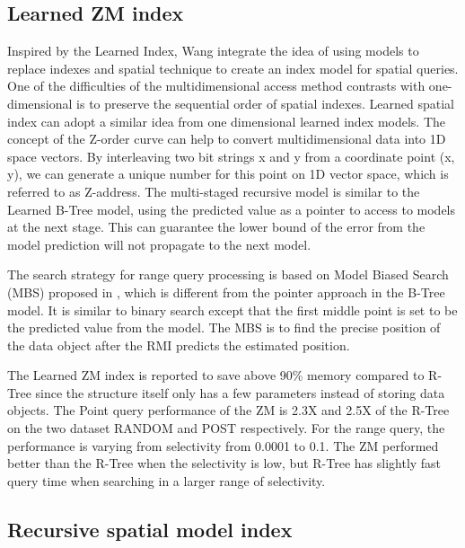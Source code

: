 \subsection{Learned ZM index}
Inspired by the Learned Index, Wang \cite{Wang:2019ks} integrate the idea of using models to replace indexes and spatial technique to create an index model for spatial queries. One of the difficulties of the multidimensional access method contrasts with one-dimensional is to preserve the sequential order of spatial indexes. Learned spatial index can adopt a similar idea from one dimensional learned index models. The concept of the Z-order curve can help to convert multidimensional data into 1D space vectors. By interleaving two bit strings x and y from a coordinate point (x, y), we can generate a unique number for this point on 1D vector space, which is referred to as Z-address. The multi-staged recursive model is similar to the Learned B-Tree model, using the predicted value as a pointer to access to models at the next stage. This can guarantee the lower bound of the error from the model prediction will not propagate to the next model. 

The search strategy for range query processing is based on Model Biased Search (MBS) proposed in \cite{Kraska:2017vh}, which is different from the pointer approach in the B-Tree model. It is similar to binary search except that the first middle point is set to be the predicted value from the model.  The MBS is to find the precise position of the data object after the RMI predicts the estimated position.

The Learned ZM index is reported to save above 90\% memory compared to R-Tree since the structure itself only has a few parameters instead of storing data objects. The Point query performance of the ZM is 2.3X and 2.5X of the R-Tree on the two dataset RANDOM and POST respectively. For the range query, the performance is varying from selectivity from 0.0001 to 0.1. The ZM performed better than the R-Tree when the selectivity is low, but R-Tree has slightly fast query time when searching in a larger range of selectivity. 



\subsection{Recursive spatial model index}

